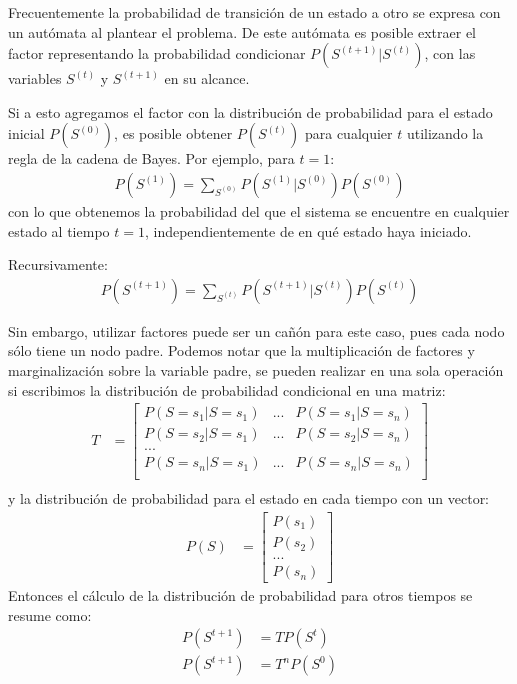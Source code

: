 Frecuentemente la probabilidad de transición de un estado a otro se expresa con un autómata al plantear el problema.  De este autómata es posible extraer el factor representando la probabilidad condicionar $P(S^{(t+1)}|S^{(t)})$, con las variables $S^{(t)}$ y  $S^{(t+1)}$ en su alcance.

Si a esto agregamos el factor con la distribución de probabilidad para el estado inicial $P(S^{(0)})$, es posible obtener $P(S^{(t)})$ para cualquier $t$ utilizando la regla de la cadena de Bayes.  Por ejemplo, para $t=1$:
\begin{align*}
 P(S^{(1)}) = \sum_{S^{(0)}} P(S^{(1)}|S^{(0)}) P(S^{(0)})
\end{align*}
con lo que obtenemos la probabilidad del que el sistema se encuentre en cualquier estado al tiempo $t=1$, independientemente de en qué estado haya iniciado.

Recursivamente:
\begin{align*}
 P(S^{(t+1)}) = \sum_{S^{(t)}} P(S^{(t+1)}|S^{(t)}) P(S^{(t)})
\end{align*}

Sin embargo, utilizar factores puede ser un cañón para este caso, pues cada nodo sólo tiene un nodo padre.  Podemos notar que la multiplicación de factores y marginalización sobre la variable padre, se pueden realizar en una sola operación si escribimos la distribución de probabilidad condicional en una matriz:
\begin{align*}
 T &= \begin{bmatrix}
        P(S=s_1|S=s_1) & ... & P(S=s_1|S=s_n) \\
        P(S=s_2|S=s_1) & ... & P(S=s_2|S=s_n) \\
        ... \\
        P(S=s_n|S=s_1) & ... & P(S=s_n|S=s_n) \\
       \end{bmatrix} \\
\end{align*}
y la distribución de probabilidad para el estado en cada tiempo con un vector:
\begin{align*}
  P(S) &= \begin{bmatrix}
	  P(s_1) \\
	  P(s_2) \\
	  ...\\
	  P(s_n)
	 \end{bmatrix}
\end{align*}
Entonces el cálculo de la distribución de probabilidad para otros tiempos se resume como:
\begin{align*}
 P(S^{t+1}) &= T P(S^{t}) \\
 P(S^{t+1}) &= T^n P(S^{0})
\end{align*}


